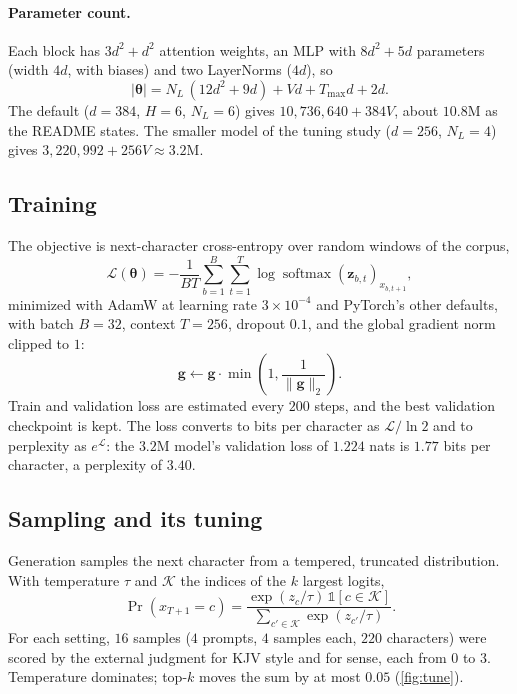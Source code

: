 \documentclass[11pt]{article}
\newcommand{\softmax}{\operatorname{softmax}}
\begin{document}
\paragraph{Parameter count.} Each block has $3d^2 + d^2$ attention weights, an
MLP with $8d^2 + 5d$ parameters (width $4d$, with biases) and two LayerNorms
($4d$), so
\begin{equation}\label{eq:params}
  |\bm\theta| = N_L\,(12 d^2 + 9 d) + V d + T_{\max} d + 2d .
\end{equation}
The default ($d = 384$, $H = 6$, $N_L = 6$) gives $10{,}736{,}640 + 384V$, about
$10.8$M as the README states. The smaller model of the tuning study
($d = 256$, $N_L = 4$) gives $3{,}220{,}992 + 256V \approx 3.2$M.

\subsection{Training}

The objective is next-character cross-entropy over random windows of the corpus,
\begin{equation}
  \mathcal{L}(\bm\theta) = -\frac{1}{BT}\sum_{b=1}^{B}\sum_{t=1}^{T}
  \log \softmax(\bm{z}_{b,t})_{x_{b,t+1}},
\end{equation}
minimized with AdamW \cite{adamw} at learning rate $3\times 10^{-4}$ and
PyTorch's other defaults, with batch $B = 32$, context $T = 256$, dropout $0.1$,
and the global gradient norm clipped to $1$:
\begin{equation}
  \bm{g} \gets \bm{g}\cdot\min\!\left(1, \frac{1}{\lVert \bm{g} \rVert_2}\right).
\end{equation}
Train and validation loss are estimated every $200$ steps, and the best
validation checkpoint is kept. The loss converts to bits per character as
$\mathcal{L}/\ln 2$ and to perplexity as $e^{\mathcal{L}}$: the $3.2$M model's
validation loss of $1.224$ nats is $1.77$ bits per character, a perplexity of
$3.40$.

\subsection{Sampling and its tuning}

Generation samples the next character from a tempered, truncated distribution.
With temperature $\tau$ and $\mathcal{K}$ the indices of the $k$ largest logits,
\begin{equation}
  \Pr(x_{T+1} = c) =
  \frac{\exp(z_c/\tau)\,\mathbb{1}[c \in \mathcal{K}]}{\sum_{c' \in \mathcal{K}} \exp(z_{c'}/\tau)}.
\end{equation}
For each setting, $16$ samples ($4$ prompts, $4$ samples each, $220$ characters)
were scored by the external judgment for KJV style and for sense, each from $0$
to $3$. Temperature dominates; top-$k$ moves the sum by at most $0.05$
(\cref{fig:tune}).
\end{document}
